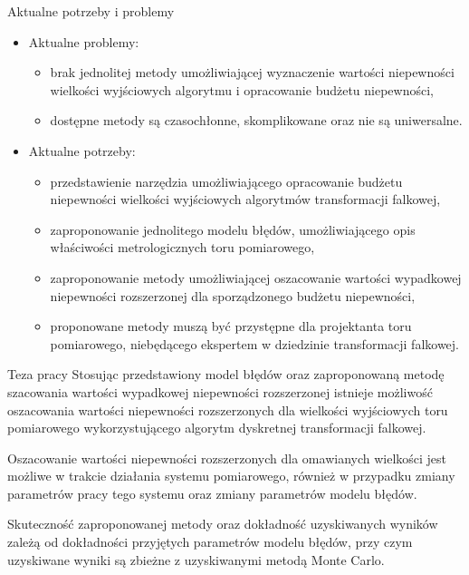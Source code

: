 \documentclass[12pt, polish, aspectratio = 169]{slides}
\begin{document}
\begin{frame}{Aktualne potrzeby i problemy}
\begin{itemize}
\item Aktualne problemy:
	\begin{itemize}
	\item brak jednolitej metody umożliwiającej wyznaczenie wartości niepewności wielkości wyjściowych algorytmu i opracowanie budżetu niepewności,
	\item dostępne metody są czasochłonne, skomplikowane oraz nie są uniwersalne.
	\end{itemize}
\item Aktualne potrzeby:
	\begin{itemize}
	\item przedstawienie narzędzia umożliwiającego opracowanie budżetu niepewności wielkości wyjściowych algorytmów transformacji falkowej,
	\item zaproponowanie jednolitego modelu błędów, umożliwiającego opis właściwości metrologicznych toru pomiarowego,
	\item zaproponowanie metody umożliwiającej oszacowanie wartości wypadkowej niepewności rozszerzonej dla sporządzonego budżetu niepewności,
	\item proponowane metody muszą być przystępne dla projektanta toru pomiarowego, niebędącego ekspertem w dziedzinie transformacji falkowej.
	\end{itemize}
\end{itemize}
\end{frame}


\begin{frame}{Teza pracy}
\justifying
Stosując przedstawiony model błędów oraz zaproponowaną metodę szacowania wartości wypadkowej niepewności rozszerzonej istnieje możliwość oszacowania wartości niepewności rozszerzonych dla wielkości wyjściowych toru pomiarowego wykorzystującego algorytm dyskretnej transformacji falkowej.

Oszacowanie wartości niepewności rozszerzonych dla omawianych wielkości jest możliwe w trakcie działania systemu pomiarowego, również w przypadku zmiany parametrów pracy tego systemu oraz zmiany parametrów modelu błędów.

Skuteczność zaproponowanej metody oraz dokładność uzyskiwanych wyników zależą od dokładności przyjętych parametrów modelu błędów, przy czym uzyskiwane wyniki są zbieżne z uzyskiwanymi metodą Monte Carlo.
\end{frame}
\end{document}
